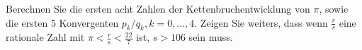 
\begin{exercise}

Berechnen Sie die ersten acht Zahlen der Kettenbruchentwicklung von $\pi$,
sowie die ersten 5 Konvergenten $p_k/q_k, k = 0,\dots,4$.
Zeigen Sie weiters, dass wenn $\frac{r}{s}$ eine rationale Zahl mit
$\pi < \frac{r}{s} < \frac{22}{7}$ ist, $s > 106$ sein muss.

\end{exercise}


\begin{solution}

\phantom{}

\end{solution}

